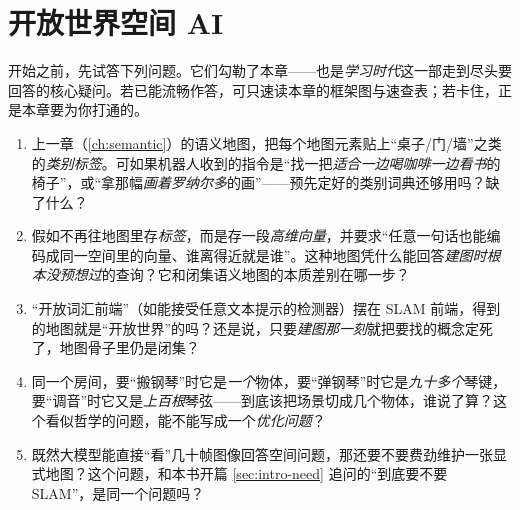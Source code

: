 \chapter{开放世界空间 AI}
\label{ch:openworld}


\begin{practice}[前置自测]
开始之前，先试答下列问题。它们勾勒了本章——也是\emph{学习时代}这一部走到尽头要回答的核心疑问。若已能流畅作答，可只速读本章的框架图与速查表；若卡住，正是本章要为你打通的。
\begin{enumerate}
  \item 上一章（\cref{ch:semantic}）的语义地图，把每个地图元素贴上“桌子/门/墙”之类的\emph{类别标签}。可如果机器人收到的指令是“找一把\emph{适合一边喝咖啡一边看书}的椅子”，或“拿那幅\emph{画着罗纳尔多}的画”——预先定好的类别词典还够用吗？缺了什么？
  \item 假如不再往地图里存\emph{标签}，而是存一段\emph{高维向量}，并要求“任意一句话也能编码成同一空间里的向量、谁离得近就是谁”。这种地图凭什么能回答\emph{建图时根本没预想过}的查询？它和闭集语义地图的本质差别在哪一步？
  \item “开放词汇前端”（如能接受任意文本提示的检测器）摆在 SLAM 前端，得到的地图就是“开放世界”的吗？还是说，只要\emph{建图那一刻}就把要找的概念定死了，地图骨子里仍是闭集？
  \item 同一个房间，要“搬钢琴”时它是\emph{一个}物体，要“弹钢琴”时它是\emph{九十多个}琴键，要“调音”时它又是\emph{上百根}琴弦——到底该把场景切成几个物体，谁说了算？这个看似哲学的问题，能不能写成一个\emph{优化问题}？
  \item 既然大模型能直接“看”几十帧图像回答空间问题，那还要不要费劲维护一张显式地图？这个问题，和本书开篇 \cref{sec:intro-need} 追问的“到底要不要 SLAM”，是同一个问题吗？
\end{enumerate}
\end{practice}


